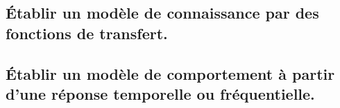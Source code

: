\documentclass[10pt,fleqn]{article}
\newcommand{\repRel}{../..}
\newcommand{\repStyle}{\repRel/Style}
\newcommand{\td}{fichier_td}
\newcommand{\repExos}{\repRel/ExercicesCompetences}
\newcommand{\repExo}{dossier}
\begin{document}
\begin{multicols}{2} 
\renewcommand{\repExo}{\repExos/B2_ProposerModele/B2_12_ModeliserSchemasCinematiques/05_RT}
\renewcommand{\td}{05_RT}
\graphicspath{{\repStyle/png/}{\repExo/images/}}


\renewcommand{\repExo}{\repExos/B2_ProposerModele/B2_13_ModeliserCinematique/05_RT}
\renewcommand{\td}{05_RT}
\graphicspath{{\repStyle/png/}{\repExo/images/}}


\renewcommand{\repExo}{\repExos/B2_ProposerModele/B2_13_ModeliserCinematique/05_RT_02}
\renewcommand{\td}{05_RT_02}
\graphicspath{{\repStyle/png/}{\repExo/images/}}


\renewcommand{\repExo}{\repExos/C1_ProposerDemarche/C1_05_ProposerDemarcheActionMecaLoiMvt_PFS/05_RT}
\renewcommand{\td}{05_RT}
\graphicspath{{\repStyle/png/}{\repExo/images/}}


\renewcommand{\repExo}{\repExos/C2_MettreEnOeuvreDemarche/C2_07_PFS/05_RT}
\renewcommand{\td}{05_RT}
\graphicspath{{\repStyle/png/}{\repExo/images/}}




\subsection{Établir un modèle de connaissance par des fonctions de transfert.} 

\renewcommand{\repExo}{\repExos/B2_ProposerModele/B2_04_ModeleConnaissance/51_MCC}
\renewcommand{\td}{51_MCC}
\graphicspath{{\repStyle/png/}{\repExo/images/}}



\subsection{Établir un modèle de comportement à partir d'une réponse temporelle ou fréquentielle. } 

\renewcommand{\repExo}{\repExos/B2_ProposerModele/B2_06_ModeleComportement/502_Divers}
\renewcommand{\td}{502_Divers}
\graphicspath{{\repStyle/png/}{\repExo/images/}}


\renewcommand{\repExo}{\repExos/B2_ProposerModele/B2_06_ModeleComportement/503_Divers}
\renewcommand{\td}{503_Divers}
\graphicspath{{\repStyle/png/}{\repExo/images/}}


\renewcommand{\repExo}{\repExos/B2_ProposerModele/B2_06_ModeleComportement/504_Divers}
\renewcommand{\td}{504_Divers}
\graphicspath{{\repStyle/png/}{\repExo/images/}}



\end{multicols}
\end{document}
